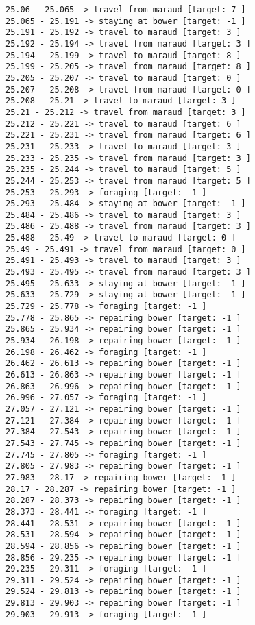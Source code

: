 \documentclass[11pt]{article}
\begin{document}
\begin{Verbatim}[commandchars=\\\{\}]
25.06 - 25.065 -> travel from maraud [target: 7 ]
25.065 - 25.191 -> staying at bower [target: -1 ]
25.191 - 25.192 -> travel to maraud [target: 3 ]
25.192 - 25.194 -> travel from maraud [target: 3 ]
25.194 - 25.199 -> travel to maraud [target: 8 ]
25.199 - 25.205 -> travel from maraud [target: 8 ]
25.205 - 25.207 -> travel to maraud [target: 0 ]
25.207 - 25.208 -> travel from maraud [target: 0 ]
25.208 - 25.21 -> travel to maraud [target: 3 ]
25.21 - 25.212 -> travel from maraud [target: 3 ]
25.212 - 25.221 -> travel to maraud [target: 6 ]
25.221 - 25.231 -> travel from maraud [target: 6 ]
25.231 - 25.233 -> travel to maraud [target: 3 ]
25.233 - 25.235 -> travel from maraud [target: 3 ]
25.235 - 25.244 -> travel to maraud [target: 5 ]
25.244 - 25.253 -> travel from maraud [target: 5 ]
25.253 - 25.293 -> foraging [target: -1 ]
25.293 - 25.484 -> staying at bower [target: -1 ]
25.484 - 25.486 -> travel to maraud [target: 3 ]
25.486 - 25.488 -> travel from maraud [target: 3 ]
25.488 - 25.49 -> travel to maraud [target: 0 ]
25.49 - 25.491 -> travel from maraud [target: 0 ]
25.491 - 25.493 -> travel to maraud [target: 3 ]
25.493 - 25.495 -> travel from maraud [target: 3 ]
25.495 - 25.633 -> staying at bower [target: -1 ]
25.633 - 25.729 -> staying at bower [target: -1 ]
25.729 - 25.778 -> foraging [target: -1 ]
25.778 - 25.865 -> repairing bower [target: -1 ]
25.865 - 25.934 -> repairing bower [target: -1 ]
25.934 - 26.198 -> repairing bower [target: -1 ]
26.198 - 26.462 -> foraging [target: -1 ]
26.462 - 26.613 -> repairing bower [target: -1 ]
26.613 - 26.863 -> repairing bower [target: -1 ]
26.863 - 26.996 -> repairing bower [target: -1 ]
26.996 - 27.057 -> foraging [target: -1 ]
27.057 - 27.121 -> repairing bower [target: -1 ]
27.121 - 27.384 -> repairing bower [target: -1 ]
27.384 - 27.543 -> repairing bower [target: -1 ]
27.543 - 27.745 -> repairing bower [target: -1 ]
27.745 - 27.805 -> foraging [target: -1 ]
27.805 - 27.983 -> repairing bower [target: -1 ]
27.983 - 28.17 -> repairing bower [target: -1 ]
28.17 - 28.287 -> repairing bower [target: -1 ]
28.287 - 28.373 -> repairing bower [target: -1 ]
28.373 - 28.441 -> foraging [target: -1 ]
28.441 - 28.531 -> repairing bower [target: -1 ]
28.531 - 28.594 -> repairing bower [target: -1 ]
28.594 - 28.856 -> repairing bower [target: -1 ]
28.856 - 29.235 -> repairing bower [target: -1 ]
29.235 - 29.311 -> foraging [target: -1 ]
29.311 - 29.524 -> repairing bower [target: -1 ]
29.524 - 29.813 -> repairing bower [target: -1 ]
29.813 - 29.903 -> repairing bower [target: -1 ]
29.903 - 29.913 -> foraging [target: -1 ]

\end{Verbatim}
\end{document}
